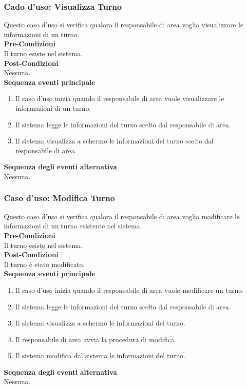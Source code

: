 \documentclass[green, fancy, 11pt]{elegantbook}
\begin{document}
\subsubsection{Cado d'uso: Visualizza Turno}
\noindent
Questo caso d’uso si verifica qualora il responsabile di area voglia visualizzare le informazioni di un turno.\\
\textbf{Pre-Condizioni}\\
Il turno esiste nel sistema.\\
\textbf{Post-Condizioni}\\
Nessuna.\\
\textbf{Sequenza eventi principale}
\begin{enumerate}
	\item Il caso d’uso inizia quando il responsabile di area vuole visualizzare le informazioni di un turno.
	\item Il sistema legge le informazioni del turno scelto dal responsabile di area.
	\item Il sistema visualizza a schermo le informazioni del turno scelto dal responsabile di area.
\end{enumerate}
\textbf{Sequenza degli eventi alternativa}\\
Nessuna.

\subsubsection{Caso d’uso: Modifica Turno}
\noindent
Questo caso d’uso si verifica qualora il responsabile di area voglia modificare le informazioni di un turno esistente nel sistema.\\
\textbf{Pre-Condizioni}\\
Il turno esiste nel sistema.\\
\textbf{Post-Condizioni}\\
Il turno è stato modificato.\\
\textbf{Sequenza eventi principale}\\
\begin{enumerate}
    \item Il caso d’uso inizia quando il responsabile di area vuole modificare un turno.
	\item Il sistema legge le informazioni del turno scelto dal responsabile di area.
	\item Il sistema visualizza a schermo le informazioni del turno.
	\item Il responsabile di area avvia la procedura di modifica.
	\item Il sistema modifica dal sistema le informazioni del turno.
\end{enumerate}
\textbf{Sequenza degli eventi alternativa}\\
Nessuna.
\end{document}
